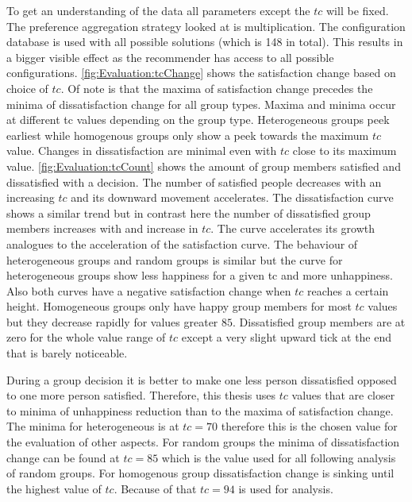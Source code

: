 To get an understanding of the data all parameters except the $tc$ will be fixed. The preference aggregation strategy looked at is multiplication. The configuration database is used with all possible solutions (which is 148 in total). This results in a bigger visible effect as the recommender has access to all possible configurations. \autoref{fig:Evaluation:tcChange} shows the satisfaction change based on choice of $tc$. Of note is that the maxima of satisfaction change precedes the minima of dissatisfaction change for all group types. Maxima and minima occur at different tc values depending on the group type. Heterogeneous groups peek earliest while homogenous groups only show a peek towards the maximum $tc$ value. Changes in dissatisfaction are minimal even with $tc$ close to its maximum value. \autoref{fig:Evaluation:tcCount} shows the amount of group members satisfied and dissatisfied with a decision. The number of satisfied people decreases with an increasing $tc$ and its downward movement accelerates. The dissatisfaction curve shows a similar trend but in contrast here the number of dissatisfied group members increases with and increase in $tc$. The curve accelerates its growth analogues to the acceleration of the satisfaction curve. The behaviour of heterogeneous groups and random groups is similar but the curve for heterogeneous groups show less happiness for a given tc and more unhappiness. Also both curves have a negative satisfaction change when $tc$ reaches a certain height. Homogeneous groups only have happy group members for most $tc$ values but they decrease rapidly for values greater $85$. Dissatisfied group members are at zero for the whole value range of $tc$ except a very slight upward tick at the end that is barely noticeable.


During a group decision it is better to make one less person dissatisfied opposed to one more person satisfied. Therefore, this thesis uses $tc$ values that are closer to minima of unhappiness reduction than to the maxima of satisfaction change. The minima for heterogeneous is at $tc = 70$ therefore this is the chosen value for the evaluation of other aspects. For random groups the minima of dissatisfaction change can be found at $tc = 85$ which is the value used for all following analysis of random groups. For homogenous group dissatisfaction change is sinking until the highest value of $tc$. Because of that $tc = 94$ is used for analysis.

